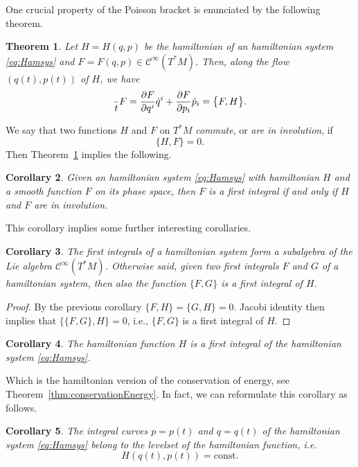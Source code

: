\documentclass[english,fontsize=11pt,paper=a5,oneside]{scrbook}
\newcommand{\cC}{\mathcal{C}}
\let\d\relax
\newcommand{\d}{\mathrm{d}}
\newtheorem{theorem}{Theorem}[chapter]
\newtheorem{corollary}[theorem]{Corollary}
\theoremstyle{definition}
\begin{document}
One crucial property of the Poisson bracket is enunciated by the following theorem.

\begin{theorem}\label{thm:poissondtdF}
  Let $H=H(q,p)$ be the hamiltonian of an hamiltonian system \eqref{eq:Hamsys} and $F=F(q,p)\in\cC^\infty(T^*M)$.
  Then, along the flow $(q(t), p(t))$ of $H$, we have
  \begin{equation}
    \frac{\d}{\d t} F = \frac{\partial F}{\partial q^i} \dot q^i + \frac{\partial F}{\partial p_i} \dot p_i = \big\{F,H\big\}.
  \end{equation}
\end{theorem}

We say that two functions $H$ and $F$ on $T^* M$ \emph{commute}, or \emph{are in involution}, if
\begin{equation}
  \big\{H,F\big\} = 0.
\end{equation}
Then Theorem~\ref{thm:poissondtdF} implies the following.
\begin{corollary}
  Given an hamiltonian system \eqref{eq:Hamsys} with hamiltonian $H$ and a smooth function $F$ on its phase space, then $F$ is a first integral if and only if $H$ and $F$ are in involution.
\end{corollary}

This corollary implies some further interesting corollaries.
\begin{corollary}
  The first integrals of a hamiltonian system form a subalgebra of the Lie algebra $\cC^\infty(T^*M)$.
  Otherwise said, given two first integrals $F$ and $G$ of a hamiltonian system, then also the function $\big\{F,G\big\}$ is a first integral of $H$.
\end{corollary}
\begin{proof}
  By the previous corollary $\big\{F,H\big\} = \big\{G,H\big\} = 0$.
  Jacobi identity then implies that $\big\{\big\{F,G\big\},H\big\} = 0$, i.e., $\big\{F,G\big\}$ is a first integral of $H$.
\end{proof}

\begin{corollary}
  The hamiltonian function $H$ is a first integral of the hamiltonian system \eqref{eq:Hamsys}.
\end{corollary}
Which is the hamiltonian version of the conservation of energy, see Theorem~\ref{thm:conservationEnergy}.
In fact, we can reformulate this corollary as follows.
\begin{corollary}
  The integral curves $p = p(t)$ and $q=q(t)$ of the hamiltonian system \eqref{eq:Hamsys} belong to the levelset of the hamiltonian function, i.e.
  \begin{equation}
    H(q(t), p(t)) = \mathrm{const}.
  \end{equation}
\end{corollary}
\end{document}
